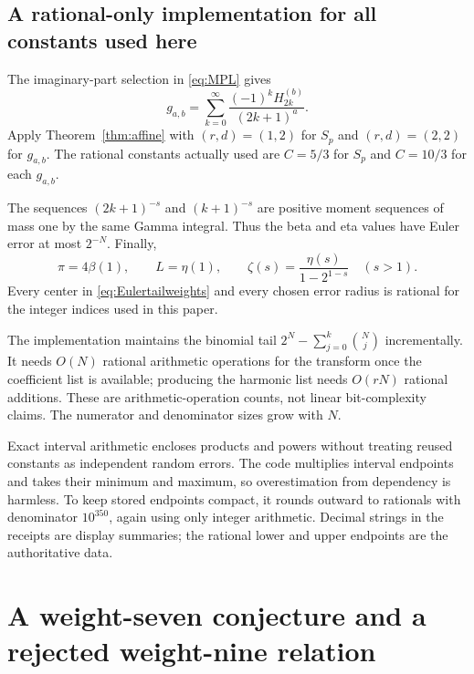 \documentclass[11pt,letterpaper]{article}
\numberwithin{equation}{section}
\theoremstyle{definition}
\begin{document}
\subsection{A rational-only implementation for all constants used here}
The imaginary-part selection in \eqref{eq:MPL} gives
\begin{equation}
 g_{a,b}=\sum_{k=0}^\infty
       \frac{(-1)^kH_{2k}^{(b)}}{(2k+1)^a}.
 \label{eq:gseries}
\end{equation}
Apply Theorem~\ref{thm:affine} with $(r,d)=(1,2)$ for $S_p$ and
$(r,d)=(2,2)$ for $g_{a,b}$. The rational constants actually used are
$C=5/3$ for $S_p$ and $C=10/3$ for each $g_{a,b}$.

The sequences $(2k+1)^{-s}$ and $(k+1)^{-s}$ are positive moment
sequences of mass one by the same Gamma integral. Thus the beta and
eta values have Euler error at most $2^{-N}$. Finally,
\begin{equation}
 \pi=4\beta(1),\qquad L=\eta(1),\qquad
 \zeta(s)=\frac{\eta(s)}{1-2^{1-s}}\quad(s>1).
 \label{eq:singleEuler}
\end{equation}
Every center in \eqref{eq:Eulertailweights} and every chosen error
radius is rational for the integer indices used in this paper.

The implementation maintains the binomial tail
$2^N-\sum_{j=0}^k\binom Nj$ incrementally. It needs $O(N)$ rational
arithmetic operations for the transform once the coefficient list is
available; producing the harmonic list needs $O(rN)$ rational additions.
These are arithmetic-operation counts, not linear bit-complexity claims.
The numerator and denominator sizes grow with $N$.

Exact interval arithmetic encloses products and powers without treating
reused constants as independent random errors. The code multiplies
interval endpoints and takes their minimum and maximum, so overestimation
from dependency is harmless. To keep stored endpoints compact, it rounds
outward to rationals with denominator $10^{350}$, again using only integer
arithmetic. Decimal strings in the receipts are display summaries;
the rational lower and upper endpoints are the authoritative data.

\section{A weight-seven conjecture and a rejected weight-nine relation}
\label{sec:discovery}
\end{document}
